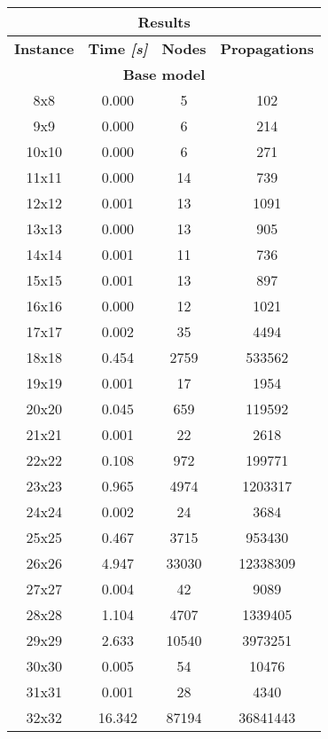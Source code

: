 \begin{center}
    \begin{tabular}{|c|c|c|c|}
        \hline
        \multicolumn{4}{|c|}{\textbf{Results}} \\
        \hline
        \textbf{Instance} & \textbf{Time \textit{[s]}} & \textbf{Nodes} & \textbf{Propagations} \\
        \multicolumn{4}{|c|}{\textbf{Base model}} \\
        \hline
        8x8 & 0.000 & 5 & 102 \\ \hline
        9x9 & 0.000 & 6 & 214 \\ \hline
        10x10 & 0.000 & 6 & 271 \\ \hline
        11x11 & 0.000 & 14 & 739 \\ \hline
        12x12 & 0.001 & 13 & 1091 \\ \hline
        13x13 & 0.000 & 13 & 905 \\ \hline
        14x14 & 0.001 & 11 & 736 \\ \hline
        15x15 & 0.001 & 13 & 897 \\ \hline
        16x16 & 0.000 & 12 & 1021 \\ \hline
        17x17 & 0.002 & 35 & 4494 \\ \hline
        18x18 & 0.454 & 2759 & 533562 \\ \hline
        19x19 & 0.001 & 17 & 1954 \\ \hline
        20x20 & 0.045 & 659 & 119592 \\ \hline
        21x21 & 0.001 & 22 & 2618 \\ \hline
        22x22 & 0.108 & 972 & 199771 \\ \hline
        23x23 & 0.965 & 4974 & 1203317 \\ \hline
        24x24 & 0.002 & 24 & 3684 \\ \hline
        25x25 & 0.467 & 3715 & 953430 \\ \hline
        26x26 & 4.947 & 33030 & 12338309 \\ \hline
        27x27 & 0.004 & 42 & 9089 \\ \hline
        28x28 & 1.104 & 4707 & 1339405 \\ \hline
        29x29 & 2.633 & 10540 & 3973251 \\ \hline
        30x30 & 0.005 & 54 & 10476 \\ \hline
        31x31 & 0.001 & 28 & 4340 \\ \hline
        32x32 & 16.342 & 87194 & 36841443 \\ \hline

\end{tabular}
\end{center}
